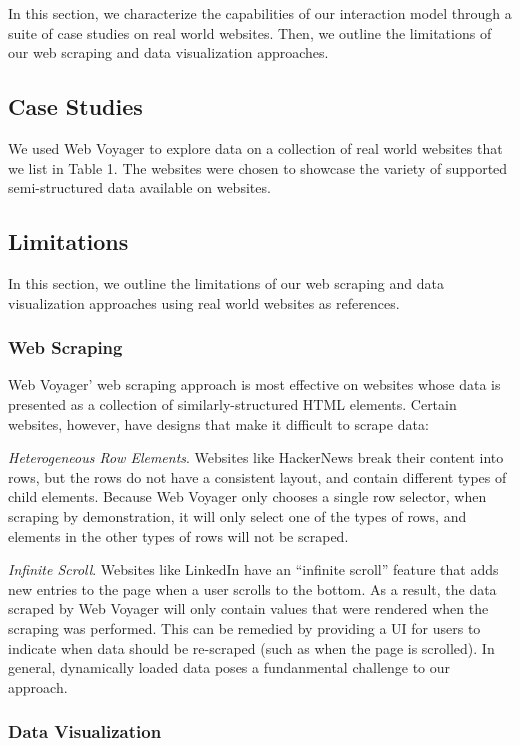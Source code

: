 \documentclass{vgtc}                          %
\begin{document}
In this section, we characterize the capabilities of our interaction
model through a suite of case studies on real world websites. Then, we
outline the limitations of our web scraping and data visualization
approaches.

\subsection{Case Studies}

We used Web Voyager to explore data on a collection of real world
websites that we list in Table 1. The websites were chosen to showcase
the variety of supported semi-structured data available on websites.

\subsection{Limitations}

In this section, we outline the limitations of our web scraping and data
visualization approaches using real world websites as references.

\subsubsection{Web Scraping}

Web Voyager' web scraping approach is most effective on websites whose
data is presented as a collection of similarly-structured HTML elements.
Certain websites, however, have designs that make it difficult to scrape
data:

\emph{Heterogeneous Row Elements}. Websites like HackerNews break their content into rows, but the rows do
not have a consistent layout, and contain different types of child
elements. Because Web Voyager only chooses a single row selector, when
scraping by demonstration, it will only select one of the types of rows,
and elements in the other types of rows will not be scraped.

\emph{Infinite Scroll}. Websites like LinkedIn have an ``infinite scroll'' feature that adds new
entries to the page when a user scrolls to the bottom. As a result, the
data scraped by Web Voyager will only contain values that were rendered
when the scraping was performed. This can be remedied by providing a UI for users
to indicate when data should be re-scraped (such as when the page is scrolled). In general, 
dynamically loaded data poses a fundanmental challenge to our approach.

\subsubsection{Data Visualization}
\end{document}
